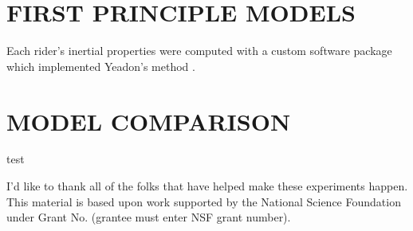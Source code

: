 \documentclass[twocolumn,10pt]{asme2e}
\begin{document}
\section*{FIRST PRINCIPLE MODELS}
Each rider's inertial properties were computed with a custom
software package \cite{Dembia2011} which implemented Yeadon's method
\cite{Yeadon1990a}.

\section*{MODEL COMPARISON}
test

\begin{acknowledgment}
	I'd like to thank all of the folks that have helped make these experiments
	happen. This material is based upon work supported by the National Science
	Foundation under Grant No. (grantee must enter NSF grant number).
\end{acknowledgment}



\end{document}

